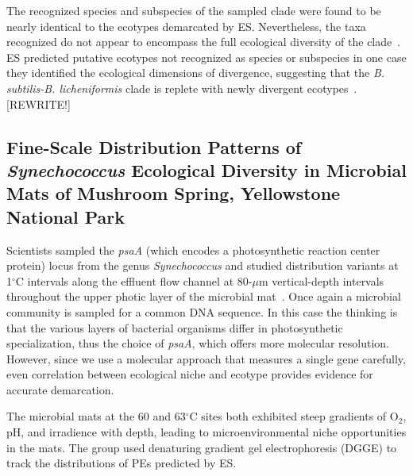 The recognized species and subspecies of the sampled clade were found to be nearly identical to the ecotypes demarcated by ES.
Nevertheless, the taxa recognized do not appear to encompass the full ecological diversity of the clade~\cite{connor2010ecology}.
ES predicted putative ecotypes not recognized as species or subspecies in one case they identified the ecological dimensions of divergence, suggesting that the \emph{B. subtilis-B. licheniformis} clade is replete with newly divergent ecotypes~\cite{connor2010ecology}. [REWRITE!]

\subsection*{Fine-Scale Distribution Patterns of \emph{Synechococcus} Ecological Diversity in Microbial Mats of Mushroom Spring, Yellowstone National Park}
Scientists sampled the \emph{psaA} (which encodes a photosynthetic reaction center protein) locus from the genus \emph{Synechococcus} and studied distribution variants at 1$^\circ$C intervals along the effluent flow channel at 80-$\mu$m vertical-depth intervals throughout the upper photic layer of the microbial mat~\cite{becraft2011fine}.
Once again a microbial community is sampled for a common DNA sequence.
In this case the thinking is that the various layers of bacterial organisms differ in photosynthetic specialization, thus the choice of \emph{psaA}, which offers more molecular resolution.
However, since we use a molecular approach that measures a single gene carefully, even correlation between ecological niche and ecotype provides evidence for accurate demarcation.

The microbial mats at the 60 and 63$^\circ$C sites both exhibited steep gradients of O$_2$, pH, and irradience with depth, leading to microenvironmental niche opportunities in the mats.
The group used denaturing gradient gel electrophoresis (DGGE) to track the distributions of PEs predicted by ES.

